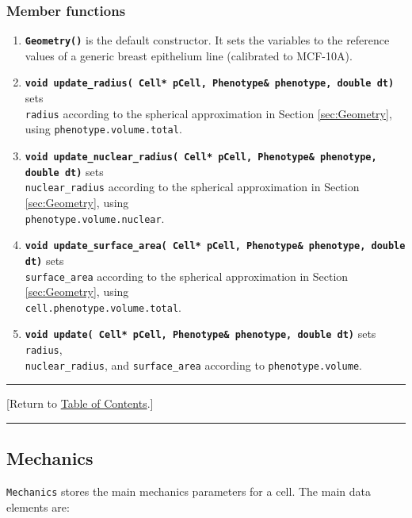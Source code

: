 \documentclass[12pt]{article}
\renewcommand{\v}{\verb}
\newcommand{\smallcode}[1]{\textbf{\texttt{#1}}}
\newcommand{\blue}[1]{\textcolor{blue}{#1}}
\newcommand{\DONE}{}%
\newcommand{\TOClink}{\begin{center}\hrule\vskip-10pt\phantom{.}\hfill[Return to \hyperlink{TOC}{Table of Contents}.]\hfill\phantom{.}\vskip3pt\hrule\end{center}}
\begin{document}
\subsubsection{Member functions}
\begin{enumerate}
\item 
\smallcode{Geometry()} is the default constructor. It sets the variables to the reference values of 
a generic breast epithelium line (calibrated to MCF-10A).  

\item 
\smallcode{void update\_radius( Cell* pCell, Phenotype\& phenotype, double dt)} sets \\ \v|radius| according to the spherical approximation in Section \ref{sec:Geometry}, 
using \v|phenotype.volume.total|. 

\item 
\smallcode{void update\_nuclear\_radius( Cell* pCell, Phenotype\& phenotype, 
double dt)} sets \\ \v|nuclear_radius| according to the spherical approximation in Section \ref{sec:Geometry}, 
using \\ \v|phenotype.volume.nuclear|. 

\item
\smallcode{void update\_surface\_area( Cell* pCell, Phenotype\& phenotype, double dt)} sets \\ \v|surface_area| according to the spherical approximation in Section \ref{sec:Geometry}, 
using \\ \v|cell.phenotype.volume.total|. 

\item 
\smallcode{void update( Cell* pCell, Phenotype\& phenotype, double dt)} sets \v|radius|, \\ \v|nuclear_radius|, and \v|surface_area| according to \v|phenotype.volume|. 
\end{enumerate}

\TOClink

\subsection{Mechanics \DONE}
\label{sec:Mechanics}
\v|Mechanics| stores the main mechanics parameters for a cell. The main data elements are: 
\end{document}
